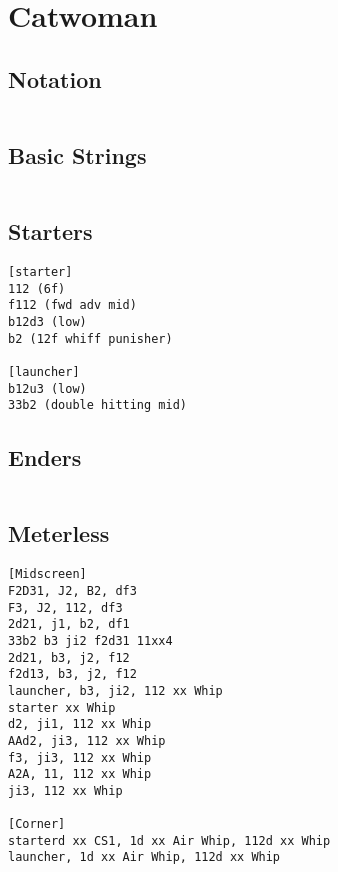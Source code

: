 \documentclass[main.tex]{subfiles}
\begin{document}
\chapter{Catwoman}

\section{Notation}
\begin{lstlisting}[language=FG]
\end{lstlisting}


\section{Basic Strings}

\begin{lstlisting}[language=FG]
\end{lstlisting}

\section{Starters}
\begin{lstlisting}[language=FG] 
[starter]
112 (6f)
f112 (fwd adv mid)
b12d3 (low)
b2 (12f whiff punisher) 

[launcher]
b12u3 (low)
33b2 (double hitting mid)
\end{lstlisting}

\section{Enders}

\begin{lstlisting}[language=FG]
\end{lstlisting}

\section{Meterless}


\begin{lstlisting}[language=FG]
[Midscreen]
F2D31, J2, B2, df3
F3, J2, 112, df3
2d21, j1, b2, df1
33b2 b3 ji2 f2d31 11xx4
2d21, b3, j2, f12 
f2d13, b3, j2, f12
launcher, b3, ji2, 112 xx Whip
starter xx Whip
d2, ji1, 112 xx Whip
AAd2, ji3, 112 xx Whip
f3, ji3, 112 xx Whip
A2A, 11, 112 xx Whip
ji3, 112 xx Whip

[Corner]
starterd xx CS1, 1d xx Air Whip, 112d xx Whip
launcher, 1d xx Air Whip, 112d xx Whip

\end{lstlisting}
\end{document}
